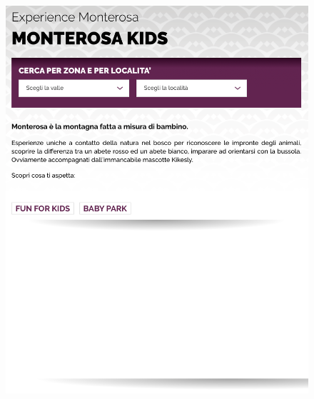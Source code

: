 \documentclass[a4paper, 11pt, parskip=half, headsepline]{scrreprt}
\begin{document}
\begin{figure}[H]
\begin{minipage}[t]{0.5\textwidth}
        \includegraphics[width=1\linewidth, keepaspectratio]{12-interaction-consistency}
        \caption{}
        \label{fig:interaction-consistency-02}
    \end{minipage} 
\end{figure}
\end{document}
